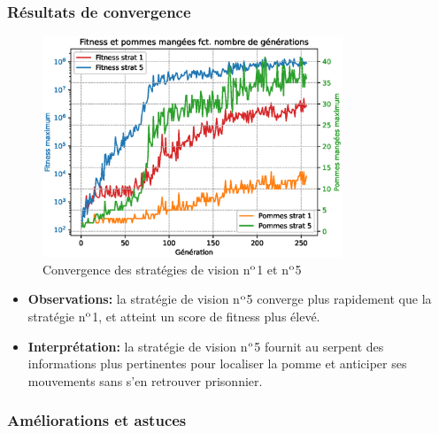 \documentclass[10pt]{beamer}
\begin{document}
\begin{frame}
\frametitle{Résultats de convergence}
\begin{figure}
\vspace{-0.3cm}
\includegraphics[width=0.8\textwidth]{curve_compare_cv.eps}
\vspace{-0.4cm}
\caption*{\tiny Convergence des stratégies de vision n$\textsuperscript{o}$1 et n$\textsuperscript{o}$5}
\end{figure}
\vspace{-0.4cm}
\begin{itemize}
\footnotesize
\item \textbf{Observations:} la stratégie de vision n$\textsuperscript{o}$5 converge plus rapidement que la stratégie n$\textsuperscript{o}$1, et atteint un score de fitness plus élevé.
\item \textbf{Interprétation:} la stratégie de vision n$\textsuperscript{o}$5 fournit au serpent des informations plus pertinentes pour localiser la pomme et anticiper ses mouvements sans s'en retrouver prisonnier.
\end{itemize}

\end{frame}

\begin{frame}
\frametitle{Améliorations et astuces}
\end{frame}
\end{document}
